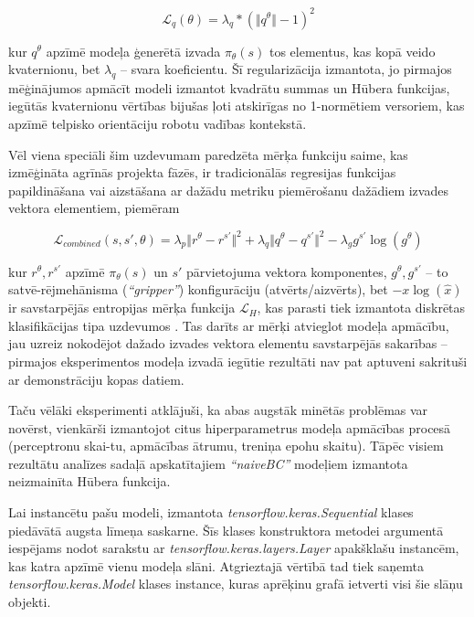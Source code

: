 \documentclass[12pt, a4paper]{article}
\numberwithin{equation}{section} %
\begin{document}
\begin{equation}
    \mathcal{L}_{q}(\theta) = \lambda_{q} * (\Vert q^{\theta} \Vert - 1)^2
\end{equation}

kur $q^{\theta}$ apzīmē modeļa ģenerētā izvada $\pi_{\theta}(s)$ tos elementus, kas kopā veido kvaternionu, bet $\lambda_q$ -- svara koeficientu. Šī regularizācija izmantota, jo pirmajos mēģinājumos apmācīt modeli izmantot kvadrātu summas un Hūbera funkcijas, iegūtās kvaternionu vērtības bijušas ļoti atskirīgas no 1-normētiem versoriem, kas apzīmē telpisko orientāciju robotu vadības kontekstā. 

Vēl viena speciāli šim uzdevumam paredzēta mērķa funkciju saime, kas izmēģināta agrīnās projekta fāzēs, ir tradicionālās regresijas funkcijas papildināšana vai aizstāšana ar dažādu metriku piemērošanu dažādiem izvades vektora elementiem, piemēram

\begin{equation}
    \mathcal{L}_{combined}(s,s',\theta) = \lambda_p \Vert r^{\theta} - r^{s'}\Vert^2 + 
    \lambda_q \Vert q^{\theta} - q^{s'}\Vert^2 - 
    \lambda_g  g^{s'} \log(g^{\theta})
\end{equation}

kur $r^{\theta}, r^{s'}$ apzīmē $\pi_{\theta}(s)$ un $s'$ pārvietojuma vektora komponentes, $g^{\theta}, g^{s'}$  -- to satvē-rējmehānisma (\textit{``gripper''}) konfigurāciju (atvērts/aizvērts), bet $-x\log(\hat{x})$ ir savstarpējās entropijas mērķa funkcija $\mathcal{L}_H$, kas parasti tiek izmantota diskrētas klasifikācijas tipa uzdevumos \cite{keras_crossentropy}. Tas darīts ar mērķi atvieglot modeļa apmācību, jau uzreiz nokodējot dažado izvades vektora elementu savstarpējās sakarības -- pirmajos eksperimentos modeļa izvadā iegūtie rezultāti nav pat aptuveni sakrituši ar demonstrāciju kopas datiem.

Taču vēlāki eksperimenti atklājuši, ka abas augstāk minētās problēmas var novērst, vienkārši izmantojot citus hiperparametrus modeļa apmācības procesā (perceptronu skai-tu, apmācības ātrumu, treniņa epohu skaitu). Tāpēc visiem rezultātu analīzes sadaļā apskatītajiem \textit{``naiveBC''} modeļiem izmantota neizmainīta Hūbera funkcija.

Lai instancētu pašu modeli, izmantota \textit{tensorflow.keras.Sequential} klases piedāvātā augsta līmeņa saskarne. Šīs klases konstruktora metodei argumentā iespējams nodot sarakstu ar \textit{tensorflow.keras.layers.Layer} apakšklašu instancēm, kas katra apzīmē vienu modeļa slāni. Atgrieztajā vērtībā tad tiek saņemta \textit{tensorflow.keras.Model} klases instance, kuras aprēķinu grafā ietverti visi šie slāņu objekti.
\end{document}
